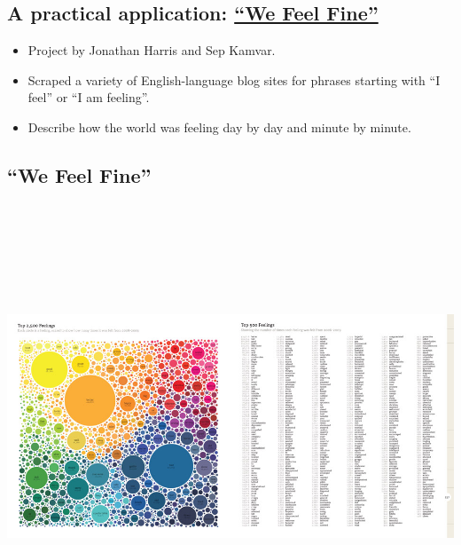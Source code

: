 \subsection{\texorpdfstring{A practical application:
\href{https://www.wefeelfine.org}{``We Feel
Fine''}}{A practical application: We Feel Fine}}\label{a-practical-application-we-feel-fine}

\begin{itemize}
\tightlist
\item
  Project by Jonathan Harris and Sep Kamvar.
\item
  Scraped a variety of English-language blog sites for phrases starting
  with ``I feel'' or ``I am feeling''.
\item
  Describe how the world was feeling day by day and minute by minute.
\end{itemize}

\subsection{\texorpdfstring{``We Feel
Fine''}{We Feel Fine}}\label{we-feel-fine}

\includegraphics[width=10.41667in,height=5.20833in]{treemap-big.jpg}

